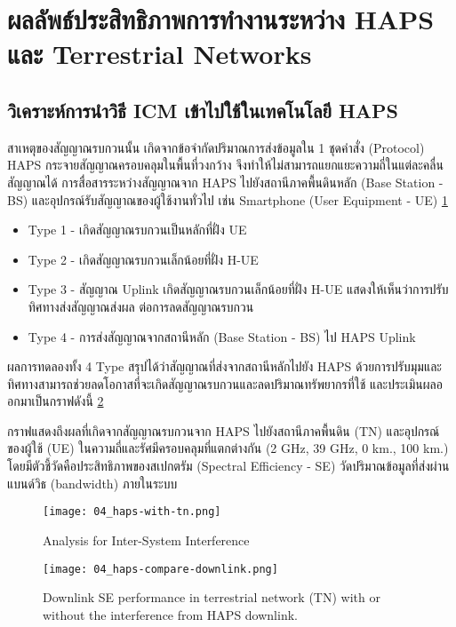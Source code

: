 \section{ผลลัพธ์ประสิทธิภาพการทำงานระหว่าง HAPS และ Terrestrial Networks}

\subsection{วิเคราะห์การนำวิธี ICM เข้าไปใช้ในเทคโนโลยี HAPS}

\begin{multicols}{2}
สาเหตุของสัญญาณรบกวนนั้น เกิดจากข้อจำกัดปริมาณการส่งข้อมูลใน 1 ชุดคำสั่ง (Protocol) 
HAPS กระจายสัญญาณครอบคลุมในพื้นที่วงกว้าง จึงทำให้ไม่สามารถแยกแยะความถี่ในแต่ละคลื่นสัญญาณได้
การสื่อสารระหว่างสัญญาณจาก HAPS ไปยังสถานีภาคพื้นดินหลัก (Base Station - BS)
และอุปกรณ์รับสัญญาณของผู้ใช้งานทั่วไป เช่น Smartphone (User Equipment - UE) \ref{fig:04-haps-with-tn}

\begin{itemize}
    \item Type 1 - เกิดสัญญาณรบกวนเป็นหลักที่ฝั่ง UE
    \item Type 2 - เกิดสัญญาณรบกวนเล็กน้อยที่ฝั่ง H-UE
    \item Type 3 - สัญญาณ Uplink เกิดสัญญาณรบกวนเล็กน้อยที่ฝั่ง H-UE แสดงให้เห็นว่าการปรับทิศทางส่งสัญญาณส่งผล
    ต่อการลดสัญญาณรบกวน
    \item Type 4 - การส่งสัญญาณจากสถานีหลัก (Base Station - BS) ไป HAPS Uplink
\end{itemize}

ผลการทดลองทั้ง 4 Type สรุปได้ว่าสัญญาณที่ส่งจากสถานีหลักไปยัง HAPS ด้วยการปรับมุมและทิศทางสามารถช่วยลดโอกาสที่จะเกิดสัญญาณรบกวนและลดปริมาณทรัพยากรที่ใช้ และประเมินผลออกมาเป็นกราฟดังนี้
\ref{fig:04-haps-compare-downlink}

กราฟแสดงถึงผลที่เกิดจากสัญญาณรบกวนจาก HAPS ไปยังสถานีภาคพื้นดิน (TN) และอุปกรณ์ของผู้ใช้ (UE)
ในความถี่และรัศมีครอบคลุมที่แตกต่างกัน (2 GHz, 39 GHz, 0 km., 100 km.) โดยมีตัวชี้วัดคือประสิทธิภาพของสเปกตรัม (Spectral Efficiency - SE)
วัดปริมาณข้อมูลที่ส่งผ่านแบนด์วิธ (bandwidth) ภายในระบบ

\columnbreak


\begin{figure}[H]
\centering
\texttt{[image: 04\_haps-with-tn.png]}
\caption[Interference Type]{Analysis for Inter-System Interference} \label{fig:04-haps-with-tn} 
\end{figure}

\begin{figure}[H]
\centering
\texttt{[image: 04\_haps-compare-downlink.png]}
\caption[HAPS compare with downlink]{Downlink SE performance in terrestrial network (TN) with or without
the interference from HAPS downlink.} \label{fig:04-haps-compare-downlink}
\end{figure}
\end{multicols}

